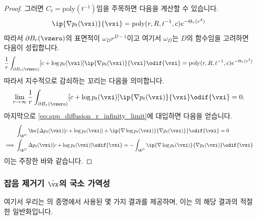 \documentclass[../../book-main_ko.tex]{subfiles}
\begin{document}
\begin{proof}
    그러면 \(C_{t} = \mathrm{poly}(t^{-1})\)임을 주목하면 다음을 계산할 수 있습니다.
    \begin{equation}
        [c + \log p_{t}(\vxi)]\ip{\nabla p_{t}(\vxi)}{\vxi} = \mathrm{poly}(r, R, t^{-1}, c)e^{-\Theta_{r}(r^{2})}
    \end{equation}
    따라서 \(\partial B_{r}(\vzero)\)의 표면적이 \(\omega_{D} r^{D - 1}\)이고 여기서 \(\omega_{D}\)는 \(D\)의 함수임을 고려하면 다음이 성립합니다.
    \begin{equation}
        \frac{1}{r}\int_{\partial B_{r}(\vzero)}[c + \log p_{t}(\vxi)]\ip{\nabla p_{t}(\vxi)}{\vxi}\odif{\vxi} = \mathrm{poly}(r, R, t^{-1}, c)e^{-\Theta_{r}(r^{2})}
    \end{equation}
    따라서 지수적으로 감쇠하는 꼬리는 다음을 의미합니다.
    \begin{equation}
        \lim_{r \to \infty}\frac{1}{r}\int_{\partial B_{r}(\vzero)}[c + \log p_{t}(\vxi)]\ip{\nabla p_{t}(\vxi)}{\vxi}\odif{\vxi} = 0.
    \end{equation}
    마지막으로 \eqref{eq:app_diffusion_r_infinity_limit}에 대입하면 다음을 얻습니다.
    \begin{align}
        &\int_{\R^{D}}\bc{\Delta p_{t}(\vxi)[c + \log p_{t}(\vxi)] + \ip{\nabla \log p_{t}(\vxi)}{\nabla p_{t}(\vxi)}}\odif{\vxi} = 0 \\
        \implies
        &\int_{\R^{D}}\Delta p_{t}(\vxi)[c + \log p_{t}(\vxi)]\odif{\vxi} = -\int_{\R^{D}}\ip{\nabla \log p_{t}(\vxi)}{\nabla p_{t}(\vxi)}\odif{\vxi}
    \end{align}
    이는 주장한 바와 같습니다.
\end{proof}

\subsubsection{잡음 제거기 \(\bar{\vx}\)의 국소 가역성}

여기서 우리는 의 증명에서 사용된 몇 가지 결과를 제공하며, 이는 \cite{Gribonval2011-pf}의 해당 결과의 적절한 일반화입니다.
\end{document}
